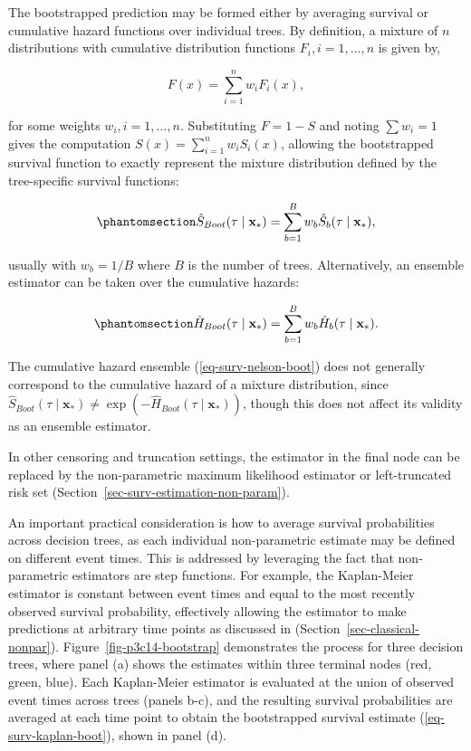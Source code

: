 \documentclass[
  letterpaper,
  krantz2]{style/krantz}
\begin{document}
The bootstrapped prediction may be formed either by averaging survival
or cumulative hazard functions over individual
trees. By definition, a mixture
of \(n\) distributions with cumulative distribution functions
\(F_i, i = 1,\ldots,n\) is given
by,

\[
F(x) = \sum^n_{i=1} w_i F_i(x),
\]

for some weights \(w_i, i = 1, \ldots, n\). Substituting \(F = 1 - S\)
and noting \(\sum w_i = 1\) gives the computation
\(S(x) = \sum^n_{i=1} w_i S_i(x)\), allowing the bootstrapped survival
function to exactly represent the mixture distribution defined by the
tree-specific survival functions:

\begin{equation}\phantomsection\label{eq-surv-kaplan-boot}{
\hat{S}_{Boot}(\tau \mid \mathbf{x}_*) = \sum^B_{b=1} w_b\hat{S}_b(\tau \mid \mathbf{x}_*),
}\end{equation}

usually with \(w_b = 1/B\) where \(B\) is the number of trees.
Alternatively, an ensemble estimator can be taken over the cumulative
hazards:

\begin{equation}\phantomsection\label{eq-surv-nelson-boot}{
\hat{H}_{Boot}(\tau \mid \mathbf{x}_*) = \sum^B_{b=1} w_b\hat{H}_b(\tau \mid \mathbf{x}_*).
}\end{equation}

The cumulative hazard ensemble (\ref{eq-surv-nelson-boot}) does not
generally correspond to the cumulative hazard of a mixture distribution,
since
\(\hat{S}_{Boot}(\tau \mid \mathbf{x}_*) \ne \exp(-\hat{H}_{Boot}(\tau \mid \mathbf{x}_*))\),
though this does not affect its validity as an ensemble estimator.

In other censoring and truncation settings, the estimator in the final
node can be replaced by the non-parametric maximum likelihood estimator
or left-truncated risk set
(Section~\ref{sec-surv-estimation-non-param}).

An important practical consideration is how to average survival
probabilities across decision trees, as each individual non-parametric
estimate may be defined on different event times. This is addressed by
leveraging the fact that non-parametric estimators are step functions.
For example, the Kaplan-Meier estimator is constant between event times
and equal to the most recently observed survival probability,
effectively allowing the estimator to make predictions at arbitrary time
points as discussed in (Section~\ref{sec-classical-nonpar}).
Figure~\ref{fig-p3c14-bootstrap} demonstrates the process for three
decision trees, where panel (a) shows the estimates within three
terminal nodes (red, green, blue). Each Kaplan-Meier estimator is
evaluated at the union of observed event times across trees (panels
b-c), and the resulting survival probabilities are averaged at each time
point to obtain the bootstrapped survival estimate
(\ref{eq-surv-kaplan-boot}), shown in panel (d).
\end{document}
